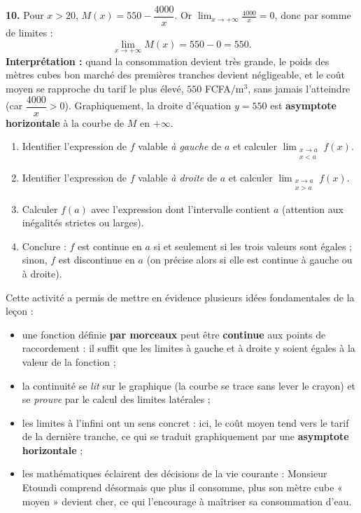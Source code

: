 \documentclass[11pt]{article}
\newcounter{popsec}
\newcounter{popsub}
\newcommand{\courssub}[1]{%
  \stepcounter{popsub}%
  \par\vspace{9pt}\noindent{\popxbold\fontsize{11.5}{13}\selectfont\color{popink}{\color{poporange}\thepopsec.\thepopsub}\hspace{6pt}#1}\par\nopagebreak\vspace{4pt}
}
\begin{document}
\begin{exoresolu}
\textbf{10.} Pour $x > 20$, $M(x) = 550 - \dfrac{4000}{x}$. Or $\displaystyle\lim_{x \to +\infty} \frac{4000}{x} = 0$, donc par somme de limites :
\[ \lim_{x \to +\infty} M(x) = 550 - 0 = 550. \]
\textbf{Interprétation :} quand la consommation devient très grande, le poids des mètres cubes bon marché des premières tranches devient négligeable, et le coût moyen se rapproche du tarif le plus élevé, $550$ FCFA/m$^3$, sans jamais l'atteindre (car $\dfrac{4000}{x} > 0$). Graphiquement, la droite d'équation $y = 550$ est \textbf{asymptote horizontale} à la courbe de $M$ en $+\infty$.
\end{exoresolu}

\begin{methode}
\begin{enumerate}
\item Identifier l'expression de $f$ valable \emph{à gauche} de $a$ et calculer $\displaystyle\lim_{\substack{x \to a \\ x < a}} f(x)$.
\item Identifier l'expression de $f$ valable \emph{à droite} de $a$ et calculer $\displaystyle\lim_{\substack{x \to a \\ x > a}} f(x)$.
\item Calculer $f(a)$ avec l'expression dont l'intervalle contient $a$ (attention aux inégalités strictes ou larges).
\item Conclure : $f$ est continue en $a$ si et seulement si les trois valeurs sont égales ; sinon, $f$ est discontinue en $a$ (on précise alors si elle est continue à gauche ou à droite).
\end{enumerate}
\end{methode}

\courssub{Bilan de l'activité}

Cette activité a permis de mettre en évidence plusieurs idées fondamentales de la leçon :
\begin{itemize}
\item une fonction définie \textbf{par morceaux} peut être \textbf{continue} aux points de raccordement : il suffit que les limites à gauche et à droite y soient égales à la valeur de la fonction ;
\item la continuité se \emph{lit} sur le graphique (la courbe se trace sans lever le crayon) et se \emph{prouve} par le calcul des limites latérales ;
\item les limites à l'infini ont un sens concret : ici, le coût moyen tend vers le tarif de la dernière tranche, ce qui se traduit graphiquement par une \textbf{asymptote horizontale} ;
\item les mathématiques éclairent des décisions de la vie courante : Monsieur Etoundi comprend désormais que plus il consomme, plus son mètre cube « moyen » devient cher, ce qui l'encourage à maîtriser sa consommation d'eau.
\end{itemize}
\end{document}
